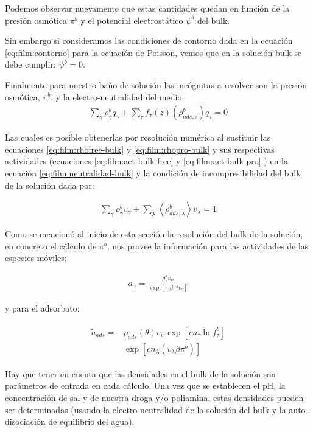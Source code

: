Podemos observar nuevamente que estas cantidades  quedan en funci\'on de la presi\'on osm\'otica $\pi^b$ y el potencial electrost\'atico $\psi^b$ del bulk.

Sin embargo si consideramos las condiciones de contorno dada en la ecuaci\'on  \ref{eq:film:contorno} para la ecuaci\'on de Poisson, vemos que en la soluci\'on bulk se debe cumplir: $\psi^b = 0$. 

Finalmente para nuestro ba\~no de soluci\'on las  inc\'ognitas a resolver son la presi\'on osm\'otica, $\pi^b$, y la electro-neutralidad del medio. 
\begin{align}
	\sum_\gamma{\rho^b_\gamma q_\gamma} + \sum_\tau{f_\tau(z) \left(\rho^b_{ads,\tau}\right) q_\tau} = 0
	\label{eq:film:neutralidad-bulk}
\end{align}

Las cuales es posible obtenerlas por resoluci\'on num\'erica al sustituir las ecuaciones  \ref{eq:film:rhofree-bulk} y
 \ref{eq:film:rhopro-bulk}  y sus respectivas actividades (ecuaciones \ref{eq:film:act-bulk-free} y \ref{eq:film:act-bulk-pro} ) en la ecuaci\'on \ref{eq:film:neutralidad-bulk} y la condici\'on de incompresibilidad del bulk de la soluci\'on dada por:

\begin{align}
	\sum_\gamma \rho^b_\gamma v_\gamma + \sum_\lambda\left< \rho^b_{ads,\lambda}\right> v_\lambda = 1
	\label{eq:incom-bulk}
\end{align}

Como se mencion\'o al inicio de esta secci\'on la resoluci\'on del bulk de la soluci\'on, en concreto el c\'alculo de $\pi^b$, nos provee la informaci\'on para las actividades de las especies m\'oviles:

\begin{align}
	a_\gamma =\frac{\rho^b_\gamma v_w}{\exp\left[-\beta \pi^b v_\gamma \right]}
	\label{eq:film:act-bulk-free}
\end{align}

 y para el adsorbato:

\begin{align}
	\begin{aligned}
		\tilde{a}_{ads} = & \rho_{ads}(\theta)v_w\exp\left[cn_\tau \ln f^b_\tau\right] \\
		& \exp \left[cn_\lambda (v_\lambda\beta\pi^b) \right]
	\end{aligned}
\label{eq:film:act-bulk-pro}
\end{align}


Hay que tener en cuenta que las densidades en el bulk de la soluci\'on son par\'ametros de entrada en cada c\'alculo. Una vez que se establecen el pH, la concentraci\'on de sal y de nuestra droga y/o poliamina, estas densidades pueden ser determinadas (usando la electro-neutralidad de la soluci\'on del bulk y la auto-disociaci\'on de equilibrio del agua).


